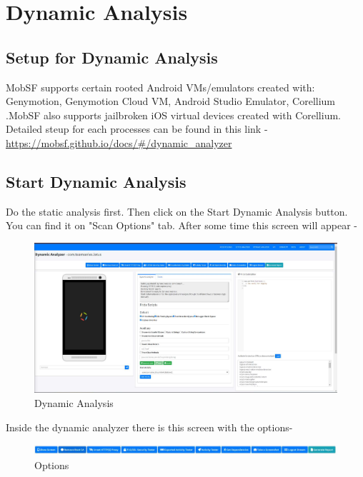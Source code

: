 \documentclass{report}
\begin{document}
\chapter{Dynamic Analysis}
\section{Setup for Dynamic Analysis}
MobSF supports certain rooted Android VMs/emulators created with: Genymotion, Genymotion Cloud VM, Android Studio Emulator, Corellium .MobSF also supports jailbroken iOS virtual devices created with Corellium. Detailed steup for each processes can be found in this link - \newline \href{https://mobsf.github.io/docs/#/dynamic_analyzer}{https://mobsf.github.io/docs/\#/dynamic\_analyzer}
\section{Start Dynamic Analysis}
Do the static analysis first. Then click on the Start Dynamic Analysis button. You can find it on "Scan Options" tab. After some time this screen will appear -


\begin{figure}[hbt!]
    \centering
    \includegraphics[width=1\linewidth]{Dynamic Analyzer/dynamic_screen.jpg}
    \caption{Dynamic Analysis}
    \label{fig:example}
\end{figure}
\FloatBarrier


Inside the dynamic analyzer there is this screen with the options-

\begin{figure}[hbt!]
    \centering
    \includegraphics[width=1\linewidth]{Dynamic Analyzer/options.jpg}
    \caption{Options}
    \label{fig:example}
\end{figure}
\FloatBarrier
\end{document}
